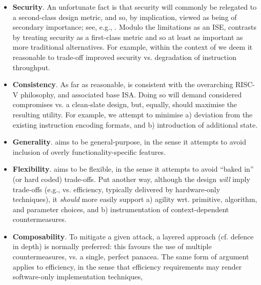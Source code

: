 \begin{itemize}
      \begin{itemize}
      \item {\bf         Security}.
            An unfortunate fact is that security will commonly be relegated 
            to a second-class design metric, and so, by implication, viewed 
            as being of secondary importance;
            see, e.g., \cite{SCARV:Lee:03,SCARV:RKLMR:03,SCARV:RRKH:04,SCARV:BurMutTiw:16}.
            Modulo the limitations as an ISE, \XCRYPTO contrasts by treating
            security as a first-class metric and so at least as important as 
            more traditional alternatives.
            For example,
            within the context of \XCRYPTO we deem it reasonable to trade-off 
            improved security vs. degradation of instruction throughput.
      \item {\bf      Consistency}.
            As far as reasonable, \XCRYPTO is consistent with the overarching
            RISC-V philosophy, and associated base ISA.  Doing so will demand 
            considered compromises vs. a clean-slate design, but, equally,
            should maximise the resulting utility.
            For example,
            we attempt to minimise 
            a) deviation from the existing instruction encoding formats,
               and 
            b) introduction of additional state.
      \item {\bf       Generality}.
            \XCRYPTO aims to be 
            general-purpose,
            in the sense it attempts to avoid
            inclusion of overly functionality-specific features.
      \item {\bf      Flexibility}. 
            \XCRYPTO aims to be
            flexible,
            in the sense it attempts to avoid
            ``baked in'' (or hard coded) trade-offs.
            Put another way, although the design {\em will} imply trade-offs 
            (e.g., vs. efficiency, typically delivered by hardware-only techniques), 
            it {\em should} more easily support
            a) agility wrt. primitive, algorithm, and parameter choices,
               and
            b) instrumentation of context-dependent countermeasures.
      \item {\bf    Composability}.
            To mitigate a given attack, a layered approach (cf. defence in 
            depth) is normally preferred: this favours the use of multiple
            countermeasures, vs. a single, perfect panacea.  The same form
            of argument applies to efficiency, in the sense that efficiency
            requirements may render software-only implementation techniques,

\end{itemize}
\end{itemize}
